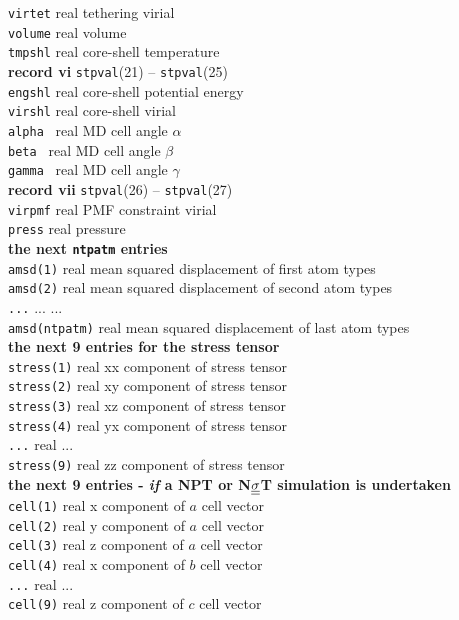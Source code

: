 \begin{tabbing}
\> {\tt virtet} \> real    \> tethering virial \\
\> {\tt volume} \> real    \> volume \\
\> {\tt tmpshl} \> real    \> core-shell temperature \\
{\bf record vi} {\tt stpval}(21) -- {\tt stpval}(25) \\
\> {\tt engshl} \> real    \> core-shell potential energy \\
\> {\tt virshl} \> real    \> core-shell virial \\
\> {\tt alpha } \> real    \> MD cell angle $\alpha$ \\
\> {\tt beta }  \> real    \> MD cell angle $\beta$ \\
\> {\tt gamma } \> real    \> MD cell angle $\gamma$ \\
{\bf record vii} {\tt stpval}(26) -- {\tt stpval}(27) \\
\> {\tt virpmf} \> real    \> PMF constraint virial \\
\> {\tt press}  \> real    \> pressure \\
{\bf the next {\tt ntpatm} entries} \\
\> {\tt amsd(1)} \> real   \> mean squared displacement of first atom types \\
\> {\tt amsd(2)} \> real   \> mean squared displacement of second atom types \\
\> {\tt ...} \> ... \> ... \\
\> {\tt amsd(ntpatm)} \> real \> mean squared displacement of last atom types \\
{\bf the next 9 entries for the stress tensor} \\
\> {\tt stress(1)} \> real \> xx component of stress tensor \\
\> {\tt stress(2)} \> real \> xy component of stress tensor \\
\> {\tt stress(3)} \> real \> xz component of stress tensor \\
\> {\tt stress(4)} \> real \> yx component of stress tensor \\
\> {\tt ...} \> real \> ... \\
\> {\tt stress(9)} \> real \> zz component of stress tensor \\
{\bf the next 9 entries - {\em if} a NPT or N$\mbox{$\underline{\underline{\bf \sigma}}$}$T simulation is undertaken} \\
\> {\tt cell(1)} \> real   \> x component of $a$ cell vector \\
\> {\tt cell(2)} \> real   \> y component of $a$ cell vector \\
\> {\tt cell(3)} \> real   \> z component of $a$ cell vector \\
\> {\tt cell(4)} \> real   \> x component of $b$ cell vector \\
\> {\tt ...} \> real \> ... \\
\> {\tt cell(9)} \> real   \> z component of $c$ cell vector \\
\end{tabbing}

